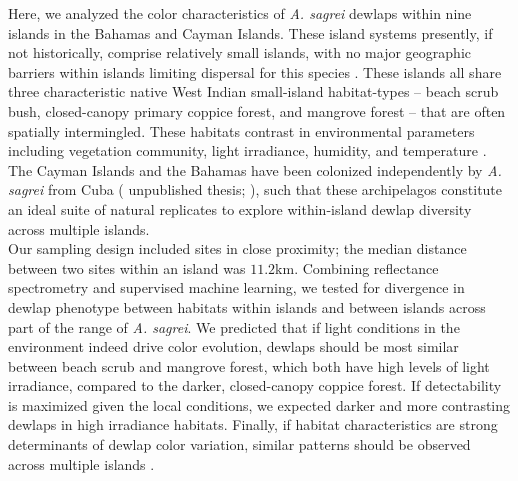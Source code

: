 Here, we analyzed the color characteristics of \textit{A. sagrei} dewlaps within nine islands in the Bahamas and Cayman Islands. These island systems presently, if not historically, comprise relatively small islands, with no major geographic barriers within islands limiting dispersal for this species \citep{Kamath2018}. These islands all share three characteristic native West Indian small-island habitat-types -- beach scrub bush, closed-canopy primary coppice forest, and mangrove forest -- that are often spatially intermingled. These habitats contrast in environmental parameters including vegetation community, light irradiance, humidity, and temperature \citep{Howard1950, Schoener1968}. The Cayman Islands and the Bahamas have been colonized independently by \textit{A. sagrei} from Cuba (\citealt{vandeSchoot2016} unpublished thesis; \citealt{Reynolds2020}), such that these archipelagos constitute an ideal suite of natural replicates to explore within-island dewlap diversity across multiple islands.\\

Our sampling design included sites in close proximity; the median distance between two sites within an island was $11.2$km. Combining reflectance spectrometry and supervised machine learning, we tested for divergence in dewlap phenotype between habitats within islands and between islands across part of the range of \textit{A. sagrei}. We predicted that if light conditions in the environment indeed drive color evolution, dewlaps should be most similar between beach scrub and mangrove forest, which both have high levels of light irradiance, compared to the darker, closed-canopy coppice forest. If detectability is maximized given the local conditions, we expected darker and more contrasting dewlaps in high irradiance habitats. Finally, if habitat characteristics are strong determinants of dewlap color variation, similar patterns should be observed across multiple islands \citep{Harvey1991, Losos2011}. 




